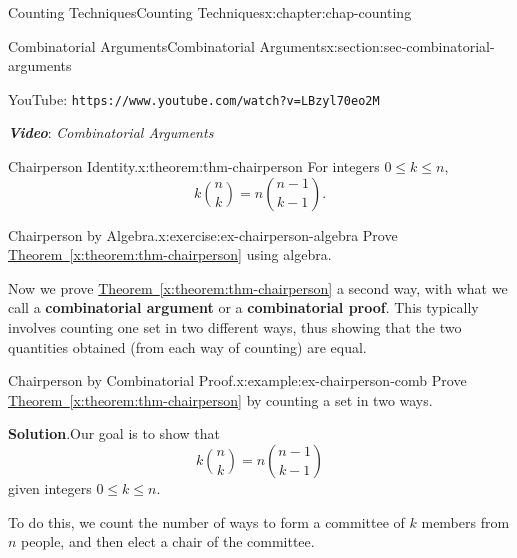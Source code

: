 \documentclass[oneside,10pt,]{book}
\newcommand{\blocktitlefont}{\relax}
\newcommand{\xreffont}{\relax}
\newcommand{\mono}[1]{\texttt{#1}}
\newcommand{\alert}[1]{\textbf{\textit{#1}}}
\newcommand{\terminology}[1]{\textbf{#1}}
\numberwithin{equation}{section}
\newlength{\qrsize}
\newlength{\previewwidth}
\begin{document}
\begin{chapterptx}{Counting Techniques}{}{Counting Techniques}{}{}{x:chapter:chap-counting}
\begin{sectionptx}{Combinatorial Arguments}{}{Combinatorial Arguments}{}{}{x:section:sec-combinatorial-arguments}
\begin{sidebyside}{1}{0}{0}{0}
\begin{sbspanel}{1}
\begin{tcbraster}[raster columns=2, raster column skip=1pt, raster halign=center, raster force size=false, raster left skip=0pt, raster right skip=0pt]
\begin{tcolorbox}[previewstyle, width=\previewwidth]
\end{tcolorbox}%
\begin{tcolorbox}[qrstyle]%
{\hypersetup{urlcolor=black}}%
\end{tcolorbox}%
\begin{tcolorbox}[captionstyle]%
\small YouTube: \mono{https://www.youtube.com/watch?v=LBzyl70eo2M}\end{tcolorbox}%
\end{tcbraster}%
\end{sbspanel}%
\end{sidebyside}%
\par
\alert{Video}: \emph{Combinatorial Arguments}%
\begin{theorem}{Chairperson Identity.}{}{x:theorem:thm-chairperson}%
For integers \(0 \leq k \leq n\),%
\begin{equation*}
k\binom{n}{k} = n\binom{n-1}{k-1}\text{.}
\end{equation*}
%
\end{theorem}
\begin{inlineexercise}{Chairperson by Algebra.}{x:exercise:ex-chairperson-algebra}%
Prove \hyperref[x:theorem:thm-chairperson]{Theorem~{\xreffont\ref{x:theorem:thm-chairperson}}} using algebra.%
\end{inlineexercise}%
Now we prove \hyperref[x:theorem:thm-chairperson]{Theorem~{\xreffont\ref{x:theorem:thm-chairperson}}} a second way, with what we call a \terminology{combinatorial argument} or a \terminology{combinatorial proof}. This typically involves counting one set in two different ways, thus showing that the two quantities obtained (from each way of counting) are equal.%
\begin{example}{Chairperson by Combinatorial Proof.}{x:example:ex-chairperson-comb}%
Prove \hyperref[x:theorem:thm-chairperson]{Theorem~{\xreffont\ref{x:theorem:thm-chairperson}}} by counting a set in two ways.%
\par\smallskip%
\noindent\textbf{\blocktitlefont Solution}.\hypertarget{g:solution:id530164}{}\quad{}Our goal is to show that%
\begin{equation}
k\binom{n}{k} = n\binom{n-1}{k-1}\label{x:men:equation-chairperson}
\end{equation}
given integers \(0 \leq k \leq n\).%
\par
To do this, we count the number of ways to form a committee of \(k\) members from \(n\) people, and then elect a chair of the committee.%
\par

\end{example}
\end{sectionptx}
\end{chapterptx}
\end{document}
